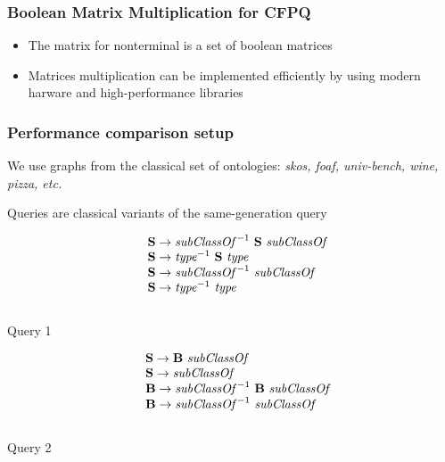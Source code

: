 \documentclass[xcolor=table]{beamer}
\begin{document}
\begin{frame} \frametitle{Boolean Matrix Multiplication for CFPQ}
  \begin{itemize}
    \item The matrix for nonterminal is a set of boolean matrices
    \item Matrices multiplication can be implemented efficiently by using modern harware and high-performance libraries
  \end{itemize}
\end{frame}

\begin{frame}[fragile] \frametitle{Performance comparison setup}
We use graphs from the classical set of ontologies: \textit{skos, foaf, univ-bench, wine, pizza, etc.}
\\
\vspace{2cm}

Queries are classical variants of the same-generation query

\begin{minipage}{0.47\textwidth}
\begin{center}
   \[
\begin{array}{rl}
  &\textbf{S} \rightarrow \text{\textit{subClassOf}}^{-1} \ \textbf{S} \ \text{\textit{subClassOf}} \\
  &\textbf{S} \rightarrow \text{\textit{type}}^{-1} \ \textbf{S} \ \text{\textit{type}} \\
  &\textbf{S} \rightarrow \text{\textit{subClassOf}}^{-1} \ \text{\textit{subClassOf}} \\
  &\textbf{S} \rightarrow \text{\textit{type}}^{-1} \ \text{\textit{type}} \\
\end{array}
\]
\\
   Query 1
   \end{center}
\end{minipage}
\vspace{2cm}
\begin{minipage} {0.47\textwidth}
   \begin{center}
   \[
\begin{array}{rl}
   &\textbf{S} \rightarrow \textbf{B} \ \text{\textit{subClassOf}} \\
   &\textbf{S} \rightarrow \text{\textit{subClassOf}} \\
   &\textbf{B} \rightarrow \text{\textit{subClassOf}}^{-1} \ \textbf{B} \ \text{\textit{subClassOf}} \\
   &\textbf{B} \rightarrow \text{\textit{subClassOf}}^{-1} \ \text{\textit{subClassOf}} \\
\end{array}
\]
\\
   Query 2
\end{center}
\end{minipage}


\end{frame}
\end{document}
